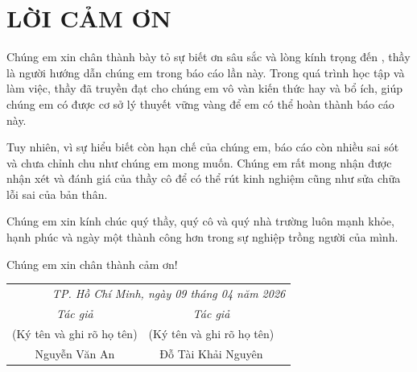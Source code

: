 \section*{LỜI CẢM ƠN}
	Chúng em xin chân thành bày tỏ sự biết ơn sâu sắc và lòng kính trọng đến \gvhd \mbox{}, thầy là người hướng dẫn chúng em trong báo cáo lần này. Trong quá trình học tập và làm việc, thầy đã truyền đạt cho chúng em vô vàn kiến thức hay và bổ ích, giúp chúng em có được cơ sở lý thuyết vững vàng để em có thể hoàn thành báo cáo này.

	Tuy nhiên, vì sự hiểu biết còn hạn chế của chúng em, báo cáo còn nhiều sai sót và chưa chỉnh chu như chúng em mong muốn. Chúng em rất mong nhận được nhận xét và đánh giá của thầy cô để có thể rút kinh nghiệm cũng như sửa chữa lỗi sai của bản thân.

    Chúng em xin kính chúc quý thầy, quý cô và quý nhà trường luôn mạnh khỏe, hạnh phúc và ngày một thành công hơn trong sự nghiệp trồng người của mình. 
    
    Chúng em xin chân thành cảm ơn!\\

\begin{flushright}
\begin{tabular}{ccc}
    \multicolumn{3}{r}{\textit{TP. Hồ Chí Minh, ngày 09 tháng 04 năm 2026}} \\
    \noalign{\vspace{0.5cm}} %
    \textit{Tác giả} & \textit{Tác giả} \\
    (Ký tên và ghi rõ họ tên) & (Ký tên và ghi rõ họ tên) \\
    \noalign{\vspace{2cm}}
    Nguyễn Văn An & Đỗ Tài Khải Nguyên \\
\end{tabular}
\end{flushright}

\newpage
